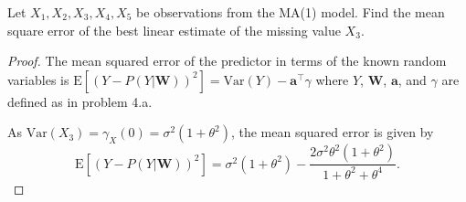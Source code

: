 \documentclass[12pt]{article}
\theoremstyle{definition}
\newenvironment{custompbm}[1]
  {\renewcommand\theproblem{#1}\problem}
  {\endproblem}
\newcommand{\E}{\text{E}}
\newcommand{\vect}[1]{\boldsymbol{#1}}
\begin{document}
\begin{custompbm}{4.b}
  Let $X_1, X_2, X_3, X_4, X_5$ be observations from the MA(1) model.
  Find the mean square error of the best linear estimate of the missing value $X_3$.
\end{custompbm}

\begin{proof}
  The mean squared error of the predictor in terms of the known random variables
  is $\E\left[(Y-P(Y|\vect{W}))^2\right] = \text{Var}(Y) - \vect{a}^\intercal \gamma$
  where $Y$, $\vect{W}$, $\vect{a}$, and $\gamma$ are defined as in problem 4.a.

  As $\text{Var}(X_3) = \gamma_X(0) = \sigma^2 (1 + \theta^2)$, the mean squared error is given by
  \[
    \E\left[(Y-P(Y|\vect{W}))^2\right] = \sigma^2 (1 + \theta^2) - \frac{2\sigma^2\theta^2 (1 + \theta^2)}{1 + \theta^2 + \theta^4}.
  \]
\end{proof}
\end{document}
